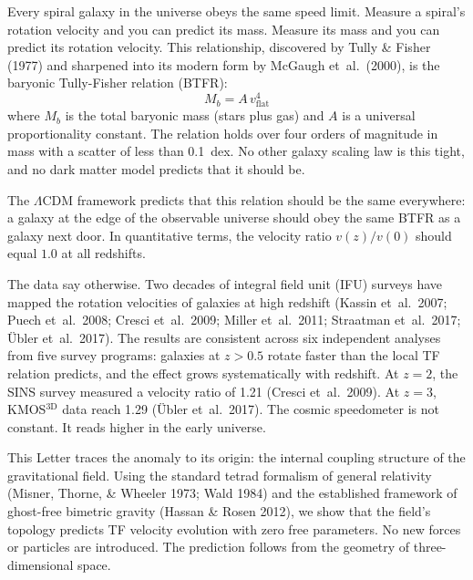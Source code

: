 \documentclass[aps,prd,preprint,superscriptaddress,showpacs,preprintnumbers,amsmath,amssymb,nofootinbib]{revtex4-2}
\begin{document}
Every spiral galaxy in the universe obeys the same speed limit. Measure a spiral's rotation velocity and you can predict its mass. Measure its mass and you can predict its rotation velocity. This relationship, discovered by Tully \& Fisher (1977) and sharpened into its modern form by McGaugh et~al.\ (2000), is the baryonic Tully-Fisher relation (BTFR):
\begin{equation}
M_b = A\,v_{\mathrm{flat}}^4
\label{eq:btfr}
\end{equation}
where $M_b$ is the total baryonic mass (stars plus gas) and $A$ is a universal proportionality constant. The relation holds over four orders of magnitude in mass with a scatter of less than 0.1~dex. No other galaxy scaling law is this tight, and no dark matter model predicts that it should be.

The $\Lambda$CDM framework predicts that this relation should be the same everywhere: a galaxy at the edge of the observable universe should obey the same BTFR as a galaxy next door. In quantitative terms, the velocity ratio $v(z)/v(0)$ should equal $1.0$ at all redshifts.

The data say otherwise. Two decades of integral field unit (IFU) surveys have mapped the rotation velocities of galaxies at high redshift (Kassin et~al.\ 2007; Puech et~al.\ 2008; Cresci et~al.\ 2009; Miller et~al.\ 2011; Straatman et~al.\ 2017; \"{U}bler et~al.\ 2017). The results are consistent across six independent analyses from five survey programs: galaxies at $z > 0.5$ rotate faster than the local TF relation predicts, and the effect grows systematically with redshift. At $z = 2$, the SINS survey measured a velocity ratio of 1.21 (Cresci et~al.\ 2009). At $z = 3$, KMOS$^{\mathrm{3D}}$ data reach 1.29 (\"{U}bler et~al.\ 2017). The cosmic speedometer is not constant. It reads higher in the early universe.

This Letter traces the anomaly to its origin: the internal coupling structure of the gravitational field. Using the standard tetrad formalism of general relativity (Misner, Thorne, \& Wheeler 1973; Wald 1984) and the established framework of ghost-free bimetric gravity (Hassan \& Rosen 2012), we show that the field's topology predicts TF velocity evolution with zero free parameters. No new forces or particles are introduced. The prediction follows from the geometry of three-dimensional space.

\end{document}
